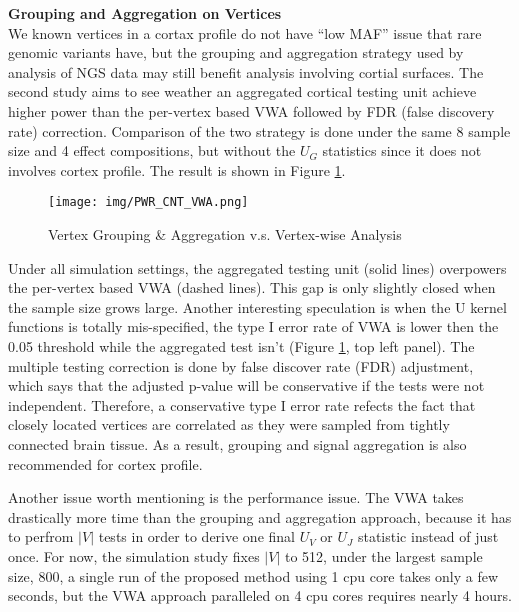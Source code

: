 \noindent \textbf{Grouping and Aggregation on Vertices} \\
We known vertices in a cortax profile do not have ``low MAF'' issue that rare genomic variants have, but the grouping and aggregation strategy used by analysis of NGS data may still benefit analysis involving cortial surfaces. The second study aims to see weather an aggregated cortical testing unit achieve higher power than the per-vertex based VWA followed by FDR (false discovery rate) correction. Comparison of the two strategy is done under the same 8 sample size and 4 effect compositions, but without the $U_G$ statistics since it does not involves cortex profile. The result is shown in Figure \ref{fig:PWR_CNT_VWA}.
\begin{figure}[!htbp]
\label{fig:PWR_CNT_VWA}
\centering
\texttt{[image: img/PWR\_CNT\_VWA.png]}
\caption{Vertex Grouping \& Aggregation v.s. Vertex-wise Analysis}
\end{figure}
Under all simulation settings, the aggregated testing unit (solid lines) overpowers the per-vertex based VWA (dashed lines). This gap is only slightly closed when the sample size grows large. Another interesting speculation is when the U kernel functions is totally mis-specified, the type I error rate of VWA is lower then the 0.05 threshold while the aggregated test isn't (Figure \ref{fig:PWR_CNT_VWA}, top left panel). The multiple testing correction is done by false discover rate (FDR) adjustment, which says that the adjusted p-value will be conservative if the tests were not independent. Therefore, a conservative type I error rate refects the fact that closely located vertices are correlated as they were sampled from tightly connected brain tissue. As a result, grouping and signal aggregation is also recommended for cortex profile.

Another issue worth mentioning is the performance issue. The VWA takes drastically more time than the grouping and aggregation approach, because it has to perfrom $|V|$ tests in order to derive one final $U_V$ or $U_J$ statistic instead of just once. For now, the simulation study fixes $|V|$ to 512, under the largest sample size, 800, a single run of the proposed method using 1 cpu core takes only a few seconds, but the VWA approach paralleled on 4 cpu cores requires nearly 4 hours.

